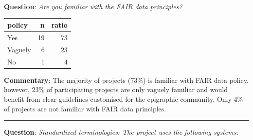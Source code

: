 \documentclass[
  12pt,
]{scrreprt}
\begin{document}
\textbf{Question}: \emph{Are you familiar with the FAIR data
principles?}

\footnotesize

\begin{longtable}[]{@{}lrr@{}}
\toprule
policy & n & ratio \\
\midrule
\endhead
Yes & 19 & 73 \\
Vaguely & 6 & 23 \\
No & 1 & 4 \\
\bottomrule
\end{longtable}

\normalsize

\textbf{Commentary}: The majority of projects (73\%) is familiar with
FAIR data policy, however, 23\% of participating projects are only
vaguely familiar and would benefit from clear guidelines customised for
the epigraphic community. Only 4\% of projects are not familiar with
FAIR data principles.

\begin{center}\rule{0.5\linewidth}{0.5pt}\end{center}

\textbf{Question}: \emph{Standardized terminologies: The project uses
the following systems:}

\footnotesize
\end{document}
